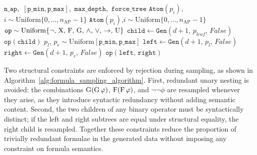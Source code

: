 \documentclass[titlepage,a4paper,11pt]{report}
\begin{document}
    \begin{algorithm}
        \caption{Recursive formula sampler. The outer call is $\texttt{Gen}(0,\, p_{leaf},\, \texttt{force\_tree})$ with $p_{leaf} \sim \mathrm{Uniform}[\texttt{p\_min}, \texttt{p\_max}]$. Redundant nesting denotes the combinations $\G(\G\,\phi)$, $\F(\F\,\phi)$, and $\neg\neg\phi$.}
        \label{alg:formula_sampling_algorithm}
        \begin{algorithmic}[1]
        \Require $\texttt{n\_ap}$,\ $[\texttt{p\_min}, \texttt{p\_max}]$,\ $\texttt{max\_depth}$,\ $\texttt{force\_tree}$
                \State \Return $\texttt{Atom}(p_i)$,\quad $i \sim \mathrm{Uniform}\{0,\ldots,n_{\text{AP}}-1\}$
            \EndIf
                \State \Return $\texttt{Atom}(p_i)$,\quad $i \sim \mathrm{Uniform}\{0,\ldots,n_{\text{AP}}-1\}$
            \EndIf
            \State $\texttt{op} \sim \mathrm{Uniform}\{\neg,\, \text{X},\, \text{F},\, \text{G},\, \land,\, \lor,\, \to,\, \text{U}\}$
                \Repeat
                    \State $\texttt{child} \leftarrow \texttt{Gen}(d+1,\, p_{leaf},\, False)$
                \State \Return $\texttt{op}(\texttt{child})$
            \Else
                \State $p_l,\, p_r \sim \mathrm{Uniform}[\texttt{p\_min}, \texttt{p\_max}]$
                \State $\texttt{left} \leftarrow \texttt{Gen}(d+1,\, p_l,\, False)$
                \Repeat
                    \State $\texttt{right} \leftarrow \texttt{Gen}(d+1,\, p_r,\, False)$
                \State \Return $\texttt{op}(\texttt{left},\, \texttt{right})$
            \EndIf
        \EndFunction
        \end{algorithmic}
    \end{algorithm}

    
    Two structural constraints are enforced by rejection during sampling, as shown in Algorithm~\ref{alg:formula_sampling_algorithm}. First, redundant unary nesting is avoided: the combinations $\G(\G\,\phi)$, $\F(\F\,\phi)$, and $\neg\neg\phi$ are resampled whenever they arise, as they introduce syntactic redundancy without adding semantic content. Second, the two children of any binary operator must be syntactically distinct; if the left and right subtrees are equal under structural equality, the right child is resampled. Together these constraints reduce the proportion of trivially redundant formulae in the generated data without imposing any constraint on formula semantics.
    
\end{document}
